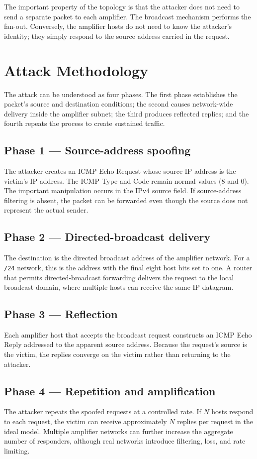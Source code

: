 \documentclass[12pt,a4paper]{article}
\begin{document}
The important property of the topology is that the attacker does not need to send a separate packet to each amplifier. The broadcast mechanism performs the fan-out. Conversely, the amplifier hosts do not need to know the attacker's identity; they simply respond to the source address carried in the request.

\section{Attack Methodology}
The attack can be understood as four phases. The first phase establishes the packet's source and destination conditions; the second causes network-wide delivery inside the amplifier subnet; the third produces reflected replies; and the fourth repeats the process to create sustained traffic.

\subsection{Phase 1 --- Source-address spoofing}
The attacker creates an ICMP Echo Request whose source IP address is the victim's IP address. The ICMP Type and Code remain normal values (8 and 0). The important manipulation occurs in the IPv4 source field. If source-address filtering is absent, the packet can be forwarded even though the source does not represent the actual sender.

\subsection{Phase 2 --- Directed-broadcast delivery}
The destination is the directed broadcast address of the amplifier network. For a \texttt{/24} network, this is the address with the final eight host bits set to one. A router that permits directed-broadcast forwarding delivers the request to the local broadcast domain, where multiple hosts can receive the same IP datagram.

\subsection{Phase 3 --- Reflection}
Each amplifier host that accepts the broadcast request constructs an ICMP Echo Reply addressed to the apparent source address. Because the request's source is the victim, the replies converge on the victim rather than returning to the attacker.

\subsection{Phase 4 --- Repetition and amplification}
The attacker repeats the spoofed requests at a controlled rate. If $N$ hosts respond to each request, the victim can receive approximately $N$ replies per request in the ideal model. Multiple amplifier networks can further increase the aggregate number of responders, although real networks introduce filtering, loss, and rate limiting.
\end{document}
